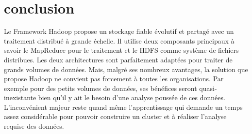 \section{conclusion}
Le Framework Hadoop propose un stockage fiable évolutif et partagé avec un traitement distribué à grande échelle. Il utilise deux composants principaux à savoir le MapReduce pour le traitement et le HDFS comme système de fichiers distribues. Les deux architectures sont parfaitement adaptées pour traiter de grands volumes de données. Mais, malgré ses nombreux avantages, la solution que propose Hadoop ne convient pas forcement à toutes les organisations. Par exemple pour des petits volumes de données, ses bénéfices seront quasi-inexistante bien qu’il y ait le besoin d’une analyse poussée de ces données. L’inconvénient majeur reste quand même l’apprentissage qui demande un temps assez considérable pour pouvoir construire un cluster et à réaliser l’analyse requise des données.
